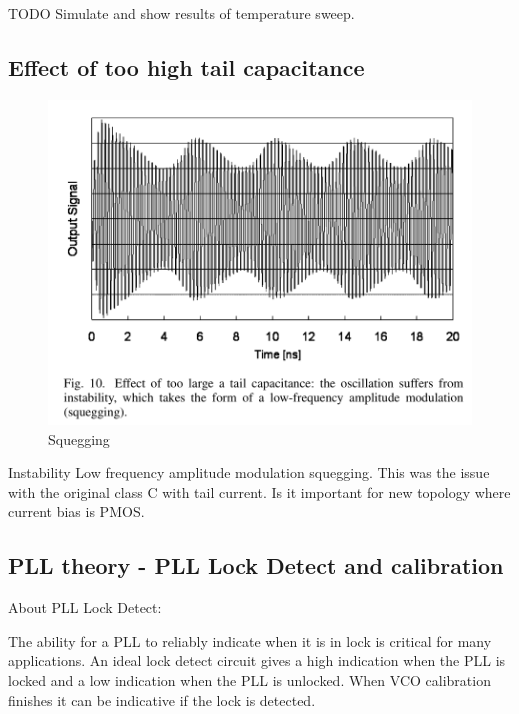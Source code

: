 
TODO Simulate and show results of temperature sweep.


\subsection{Effect of too high tail capacitance}

\begin{figure}[!ht]
	\includegraphics[width=\linewidth]{Figures/squegging.png}
	\caption{Squegging}
	\label{fig:squegging}
\end{figure}

Instability Low frequency amplitude modulation squegging. This was the issue with the original class C with tail current. Is it important for new topology where current bias is PMOS.

\subsection{PLL theory - PLL Lock Detect and calibration}

About PLL Lock Detect:

\begin{info} %
	The ability for a PLL to reliably indicate when it is in lock is critical for many applications. An ideal lock detect circuit gives a high indication when the PLL is locked and a low indication when the PLL is unlocked. When VCO calibration finishes it can be indicative if the lock is detected. 
\end{info}

